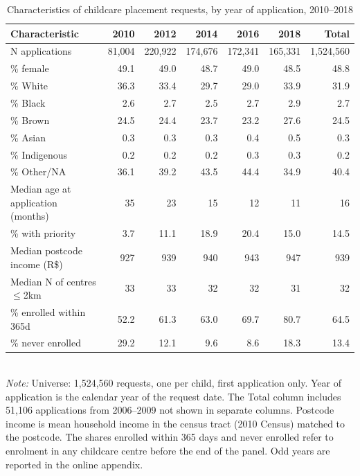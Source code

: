 \begin{table}[htbp]\centering
\caption{Characteristics of childcare placement requests, by year of application, 2010--2018}
\label{tab:T1_fila}
\small
\setlength{\tabcolsep}{4pt}
\begin{tabular}{lrrrrrr}
\toprule
Characteristic & 2010 & 2012 & 2014 & 2016 & 2018 & Total \\
\midrule
N applications & 81,004 & 220,922 & 174,676 & 172,341 & 165,331 & 1,524,560 \\
\% female & 49.1 & 49.0 & 48.7 & 49.0 & 48.5 & 48.8 \\
\% White & 36.3 & 33.4 & 29.7 & 29.0 & 33.9 & 31.9 \\
\% Black & 2.6 & 2.7 & 2.5 & 2.7 & 2.9 & 2.7 \\
\% Brown & 24.5 & 24.4 & 23.7 & 23.2 & 27.6 & 24.5 \\
\% Asian & 0.3 & 0.3 & 0.3 & 0.4 & 0.5 & 0.3 \\
\% Indigenous & 0.2 & 0.2 & 0.2 & 0.3 & 0.3 & 0.2 \\
\% Other/NA & 36.1 & 39.2 & 43.5 & 44.4 & 34.9 & 40.4 \\
Median age at application (months) & 35 & 23 & 15 & 12 & 11 & 16 \\
\% with priority & 3.7 & 11.1 & 18.9 & 20.4 & 15.0 & 14.5 \\
Median postcode income (R\$) & 927 & 939 & 940 & 943 & 947 & 939 \\
Median N of centres $\leq$2km & 33 & 33 & 32 & 32 & 31 & 32 \\
\% enrolled within 365d & 52.2 & 61.3 & 63.0 & 69.7 & 80.7 & 64.5 \\
\% never enrolled & 29.2 & 12.1 & 9.6 & 8.6 & 18.3 & 13.4 \\
\bottomrule
\end{tabular}
\\[3pt]{\footnotesize \textit{Note:} Universe: 1,524,560 requests, one per child, first application only. Year of application is the calendar year of the request date. The Total column includes 51,106 applications from 2006--2009 not shown in separate columns. Postcode income is mean household income in the census tract (2010 Census) matched to the postcode. The shares enrolled within 365 days and never enrolled refer to enrolment in any childcare centre before the end of the panel. Odd years are reported in the online appendix.}
\end{table}
